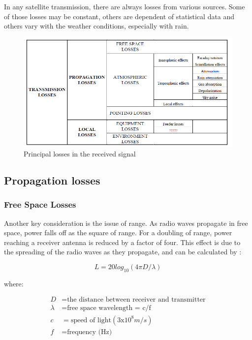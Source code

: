 In any satellite transmission, there are always losses from various sources. Some of
those losses may be constant, others are dependent of statistical data and others vary
with the weather conditions, especially with rain.

\begin{figure}[H]
	\includegraphics[scale=0.8]{./sections/SatelliteDept/sections/images/principal_losses}
	\centering
	\caption[Principal losses in the received signal]{Principal losses in the received signal \cite{Jorge2012}}
	\label{principal_losses}
\end{figure}

\subsection{Propagation losses}
\subsubsection{Free Space Losses}
Another key consideration is the issue of range. As radio waves propagate in free space, power falls off as the square of range. For a doubling of range, power reaching a receiver antenna is reduced by a factor of four. This effect is due to the spreading of the radio waves as they propagate, and can be calculated by \cite{Note1998}:

\begin{equation}
L=20log_{10}(4\pi D/\lambda)
\label{FSP}
\end{equation}

where:

\begin{align*}
	D&= \text{the distance between receiver and transmitter}\\
	\lambda&= \text{free space wavelength = c/f}\\
	c&= \text{speed of light}(3\mathrm{x}10^8m/s)\\
	f&= \text{frequency (Hz)}
\end{align*}

